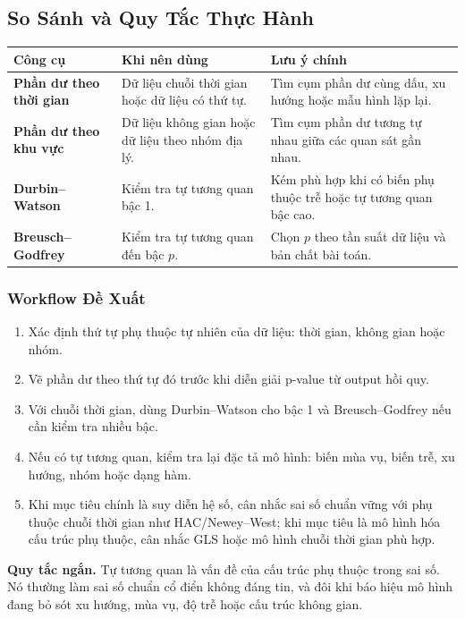 \subsection{So Sánh và Quy Tắc Thực Hành}

\begin{center}
\small
\begin{tabularx}{\textwidth}{@{}>{\bfseries}l>{\raggedright\arraybackslash}X>{\raggedright\arraybackslash}X@{}}
\toprule
Công cụ & Khi nên dùng & Lưu ý chính \\
\midrule
Phần dư theo thời gian & Dữ liệu chuỗi thời gian hoặc dữ liệu có thứ tự. & Tìm cụm phần dư cùng dấu, xu hướng hoặc mẫu hình lặp lại. \\
Phần dư theo khu vực & Dữ liệu không gian hoặc dữ liệu theo nhóm địa lý. & Tìm cụm phần dư tương tự nhau giữa các quan sát gần nhau. \\
Durbin--Watson & Kiểm tra tự tương quan bậc 1. & Kém phù hợp khi có biến phụ thuộc trễ hoặc tự tương quan bậc cao. \\
Breusch--Godfrey & Kiểm tra tự tương quan đến bậc $p$. & Chọn $p$ theo tần suất dữ liệu và bản chất bài toán. \\
\bottomrule
\end{tabularx}
\end{center}

\subsubsection{Workflow Đề Xuất}

\begin{enumerate}
  \item Xác định thứ tự phụ thuộc tự nhiên của dữ liệu: thời gian, không gian hoặc nhóm.
  \item Vẽ phần dư theo thứ tự đó trước khi diễn giải p-value từ output hồi quy.
  \item Với chuỗi thời gian, dùng Durbin--Watson cho bậc 1 và Breusch--Godfrey nếu cần kiểm tra nhiều bậc.
  \item Nếu có tự tương quan, kiểm tra lại đặc tả mô hình: biến mùa vụ, biến trễ, xu hướng, nhóm hoặc dạng hàm.
  \item Khi mục tiêu chính là suy diễn hệ số, cân nhắc sai số chuẩn vững với phụ thuộc chuỗi thời gian như HAC/Newey--West; khi mục tiêu là mô hình hóa cấu trúc phụ thuộc, cân nhắc GLS hoặc mô hình chuỗi thời gian phù hợp.
\end{enumerate}

\begin{tipbox}
\textbf{Quy tắc ngắn.} Tự tương quan là vấn đề của cấu trúc phụ thuộc trong sai số. Nó thường làm sai số chuẩn cổ điển không đáng tin, và đôi khi báo hiệu mô hình đang bỏ sót xu hướng, mùa vụ, độ trễ hoặc cấu trúc không gian.
\end{tipbox}

